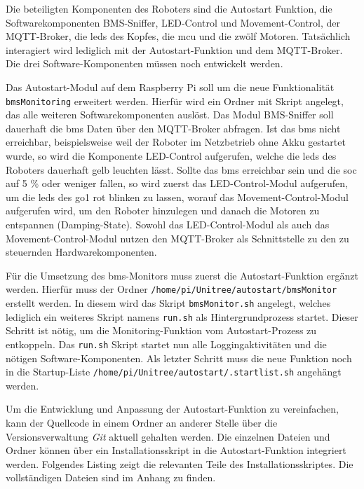 \noindent Die beteiligten Komponenten des Roboters sind die Autostart Funktion, die Softwarekomponenten BMS-\allowbreak Sniffer, LED-\allowbreak Control
und Movement-Control, der MQTT-Broker, die \glspl{led} des Kopfes, die \gls{mcu} und die zwölf Motoren.
Tatsächlich interagiert wird lediglich mit der Autostart-Funktion und dem MQTT-Broker. Die drei Software-Komponenten müssen
noch entwickelt werden.

Das Autostart-Modul auf dem Raspberry Pi soll um die neue Funktionalität \texttt{bmsMonitoring} erweitert werden.
Hierfür wird ein Ordner mit Skript angelegt, das alle weiteren Softwarekomponenten auslöst.
Das Modul BMS-Sniffer soll dauerhaft die \gls{bms} Daten über den MQTT-Broker abfragen.
Ist das \gls{bms} nicht erreichbar, beispielsweise weil der Roboter im Netzbetrieb ohne Akku gestartet wurde,
so wird die Komponente LED-Control aufgerufen, welche die \glspl{led} des Roboters dauerhaft gelb leuchten lässt.
Sollte das \gls{bms} erreichbar sein und die \gls{soc} auf \num{5} \% oder weniger fallen, so wird zuerst das LED-Control-Modul
aufgerufen, um die \glspl{led} des \gls{go1} rot blinken zu lassen, worauf das Movement-Control-Modul aufgerufen wird,
um den Roboter hinzulegen und danach die Motoren zu entspannen (Damping-State).
Sowohl das LED-Control-Modul als auch das Movement-Control-Modul nutzen den MQTT-Broker als Schnittstelle zu den zu steuernden
Hardwarekomponenten.


Für die Umsetzung des \gls{bms}-Monitors muss zuerst die Autostart-Funktion ergänzt werden.
Hierfür muss der Ordner \texttt{/home/\allowbreak pi/\allowbreak Unitree/\allowbreak autostart/\allowbreak bmsMonitor}
erstellt werden.
In diesem wird das Skript \texttt{bmsMonitor.sh} angelegt, welches lediglich ein weiteres Skript namens \texttt{run.sh}
als Hintergrundprozess startet.
Dieser Schritt ist nötig, um die Monitoring-Funktion vom Autostart-Prozess zu entkoppeln.
Das \texttt{run.sh} Skript startet nun alle Loggingaktivitäten und die nötigen Software-Komponenten.
Als letzter Schritt muss die neue Funktion noch in die Startup-Liste
\texttt{/home/pi/Unitree/autostart/.startlist.sh}
angehängt werden.

Um die Entwicklung und Anpassung der Autostart-Funktion zu vereinfachen, kann der Quellcode in einem Ordner an anderer
Stelle über die Versionsverwaltung \emph{Git} aktuell gehalten werden.
Die einzelnen Dateien und Ordner können über ein Installationsskript in die Autostart-Funktion integriert werden.
Folgendes Listing zeigt die relevanten Teile des Installationsskriptes.
Die vollständigen Dateien sind im Anhang zu finden.


